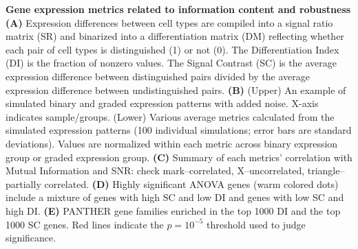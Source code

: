 \textbf{Gene expression metrics related to information content and robustness}
\textbf{(A)} Expression differences between cell types are compiled into a signal ratio matrix (SR) and binarized into a differentiation matrix (DM) reflecting whether each pair of cell types is distinguished (1) or not (0). The Differentiation Index (DI) is the fraction of nonzero values. The Signal Contrast (SC) is the average expression difference between distinguished pairs divided by the average expression difference between undistinguished pairs. 
\textbf{(B)} (Upper) An example of simulated binary and graded expression patterns with added noise. X-axis indicates sample/groups. (Lower) Various average metrics calculated from the simulated expression patterns (100 individual simulations; error bars are standard deviations). Values are normalized within each metric across binary expression group or graded expression group. 
\textbf{(C)} Summary of each metrics' correlation with Mutual Information and SNR: check mark--correlated, X--uncorrelated, triangle--partially correlated.
\textbf{(D)} Highly significant ANOVA genes (warm colored dots) include a mixture of genes with high SC and low DI and genes with low SC and high DI. 
\textbf{(E)} PANTHER \citep{Thomas_2003} gene families enriched in the top 1000 DI and the top 1000 SC genes. Red lines indicate the $p=10^{-5}$ threshold used to judge significance.
